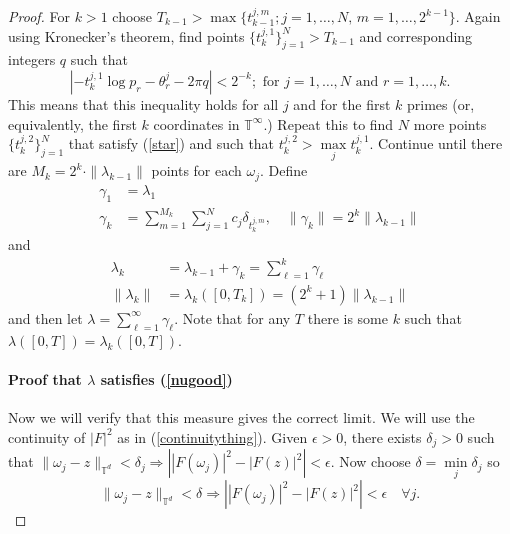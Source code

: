 \documentclass[]{elsarticle}
\newcommand{\T}{\mathbb{T}}
\numberwithin{equation}{section}
\begin{document}
\begin{proof}
          For $k>1$ choose $T_{k-1}> \max\{t_{k-1}^{j,m}; j=1,\dots,N,\, m=1,\dots,2^{k-1}\}$. Again using Kronecker's theorem, find points $\{t_k^{j,1}\}_{j=1}^N>T_{k-1}$ and corresponding integers $q$ such that
            \begin{equation} \label{star}
              |-t_k^{j,1}\log p_r -\theta_r^j  -2\pi q|<2^{-k}; \text{ for } j=1,\dots,N \text{ and } r=1,\dots,k.
            \end{equation}
          This means that this inequality holds for all $j$ and for the first $k$ primes (or, equivalently, the first $k$ coordinates in $\T^\infty$.) Repeat this to find $N$ more points $\{t_k^{j,2}\}_{j=1}^N$ that satisfy (\ref{star}) and such that $t_k^{j,2}>\max\limits_j t_k^{j,1}$. Continue until there are $M_k=2^k\cdot \|\lambda_{k-1}\|$ points for each $\omega_j$. Define
          \begin{align*}
            \gamma_1 &= \lambda_1\\
            \gamma_k &= \sum_{m=1}^{M_k} \sum_{j=1}^{N}c_j \delta_{t_k^{j,m}}, \quad \|\gamma_k\|=2^k\|\lambda_{k-1}\|
          \end{align*}
          and
          \begin{align}
            \lambda_k &= \lambda_{k-1}+\gamma_k = \sum_{\ell=1}^{k}\gamma_\ell\\
            \|\lambda_k\|&=\lambda_k\left([0,T_k]\right)=(2^k+1)\|\lambda_{k-1}\| \label{sizeofLambdaK}
          \end{align}
          and then let $\lambda = \sum_{\ell=1}^{\infty}\gamma_\ell$. Note that for any $T$ there is some $k$ such that $\lambda\left([0,T]\right)=\lambda_k\left([0,T]\right)$.
          

        \paragraph{Proof that $\lambda$ satisfies (\ref{nugood})}
          Now we will verify that this measure gives the correct limit. We will use the continuity of $|F|^2$ as in (\ref{continuitything}). Given $\epsilon>0$, there exists $\delta_j>0$ such that $\|\omega_j-z\|_{\T^d}<\delta_j\Rightarrow \left||F(\omega_j)|^2-|F(z)|^2\right|<\epsilon$. Now choose $\delta=\min\limits_j \delta_j$ so 
          \begin{equation}\label{cont}
            \|\omega_j-z\|_{\T^d}<\delta \Rightarrow \left||F(\omega_j)|^2-|F(z)|^2\right|<\epsilon\quad \forall j.
          \end{equation}


\end{proof}
\end{document}
